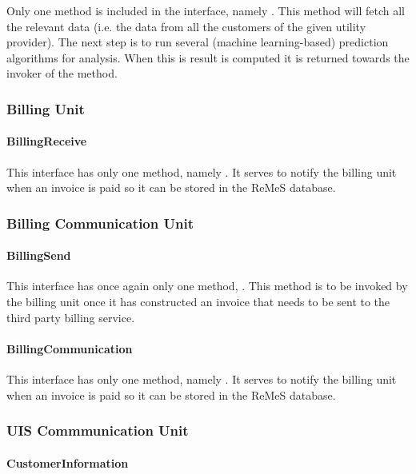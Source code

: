 \npar Only one method is included in the  interface,
namely . This method will
fetch all the relevant data (i.e. the data from all the customers of the given
utility provider). The next step is to run several (machine learning-based)
prediction algorithms for analysis. When this is result is computed it is
returned towards the invoker of the method.

\subsubsection{Billing Unit}

\paragraph{BillingReceive}

\npar This interface has only one method, namely . It
serves to notify the billing unit when an invoice is paid so it can be stored in
the ReMeS database.

\subsubsection{Billing Communication Unit}

\paragraph{BillingSend}

\npar This interface has once again only one method, .
This method is to be invoked by the billing unit once it has constructed an
invoice that needs to be sent to the third party billing service.

\paragraph{BillingCommunication}

\npar This interface has only one method, namely . It
serves to notify the billing unit when an invoice is paid so it can be stored in
the ReMeS database.

\subsubsection{UIS Commmunication Unit}

\paragraph{CustomerInformation}

